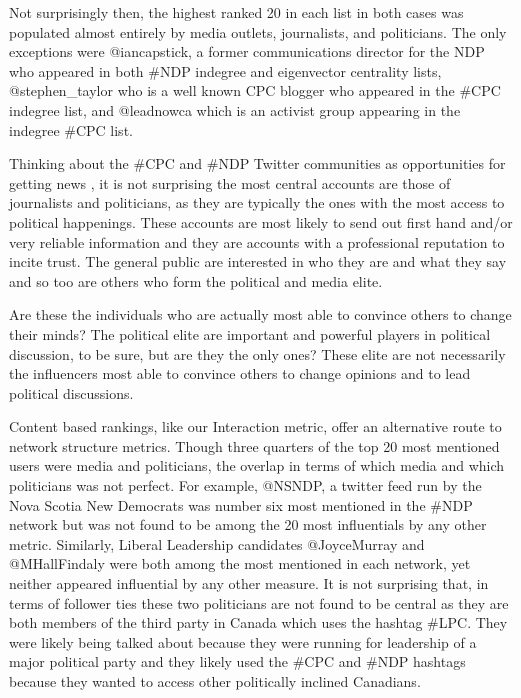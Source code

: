 \documentclass[a4paper,12pt]{article}
\begin{document}
Not surprisingly then, the highest ranked 20 in each list in both cases was populated almost entirely by media outlets, journalists, and politicians. The only exceptions were @iancapstick, a former communications director for the NDP who appeared in both \#NDP indegree and eigenvector centrality lists, @stephen\_taylor who is a well known CPC blogger who appeared in the \#CPC indegree list, and @leadnowca which is an activist group appearing in the indegree \#CPC list.

Thinking about the \#CPC and \#NDP Twitter communities as opportunities for getting news \cite{KwakLeeParkMoon2010}, it is not surprising the most central accounts are those of journalists and politicians, as they are typically the ones with the most access to political happenings. These accounts are most likely to send out first hand and/or very reliable information and they are accounts with a professional reputation to incite trust. The general public are interested in who they are and what they say and so too are others who form the political and media elite.

Are these the individuals who are actually most able to convince others to change their minds? The political elite are important and powerful players in political discussion, to be sure, but are they the only ones? These elite are not necessarily the influencers most able to convince others to change opinions and to lead political discussions.

Content based rankings, like our Interaction metric, offer an alternative route to network structure metrics. Though three quarters of the top 20 most mentioned users were media and politicians, the overlap in terms of which media and which politicians was not perfect. For example, @NSNDP, a twitter feed run by the Nova Scotia New Democrats was number six most mentioned in the \#NDP network but was not found to be among the 20 most influentials by any other metric. Similarly, Liberal Leadership candidates @JoyceMurray and @MHallFindaly were both among the most mentioned in each network, yet neither appeared influential by any other measure. It is not surprising that, in terms of follower ties these two politicians are not found to be central as they are both members of the third party in Canada which uses the hashtag \#LPC. They were likely being talked about because they were running for leadership of a major political party and they likely used the \#CPC and \#NDP hashtags because they wanted to access other politically inclined Canadians.
\end{document}
